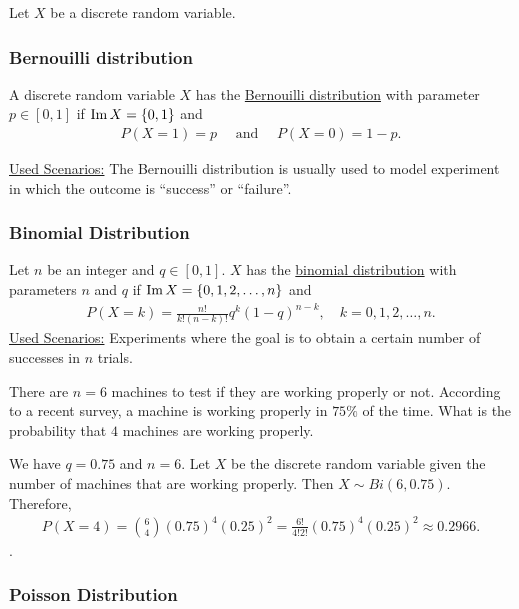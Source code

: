 Let $X$ be a discrete random variable. 

\subsubsection*{Bernouilli distribution}
A discrete random variable $X$ has the \underline{Bernouilli distribution} with parameter $p \in [0, 1]$ if $\operatorname{Im} X = \{ 0 , 1 \}$ and
    \begin{align*}
    P (X = 1) = p \quad \text{ and } \quad P (X = 0) = 1 - p .
    \end{align*} 

\underline{Used Scenarios:} The Bernouilli distribution is usually used to model experiment in which the outcome is ``success'' or ``failure''.

\subsubsection*{Binomial Distribution}

Let $n$ be an integer and $q \in [0, 1]$. $X$ has the \underline{binomial distribution} with parameters $n$ and $q$ if $\operatorname{Im} X = \{ 0 , 1, 2, \ldots , n \}$ and
    \begin{align*}
    P (X = k) = \frac{n!}{k! (n - k)!} q^k (1 - q)^{n - k} , \quad k = 0, 1, 2, \ldots , n .
    \end{align*} 
\underline{Used Scenarios:} Experiments where the goal is to obtain a certain number of successes in $n$ trials.

\begin{example}
There are $n = 6$ machines to test if they are working properly or not. According to a recent survey, a machine is working properly in $75\%$ of the time. What is the probability that $4$ machines are working properly.
\end{example}

\begin{sol*}
We have $q = 0.75$ and $n = 6$. Let $X$ be the discrete random variable given the number of machines that are working properly. Then $X \sim Bi (6, 0.75)$. Therefore,
    \begin{align*}
    P (X = 4) = \binom{6}{4} (0.75)^4 (0.25)^{2} = \frac{6!}{4! 2!} (0.75)^4 (0.25)^2 \approx 0.2966 . \tag*{$\triangle$}
    \end{align*} .
\end{sol*}

\subsubsection*{Poisson Distribution}

